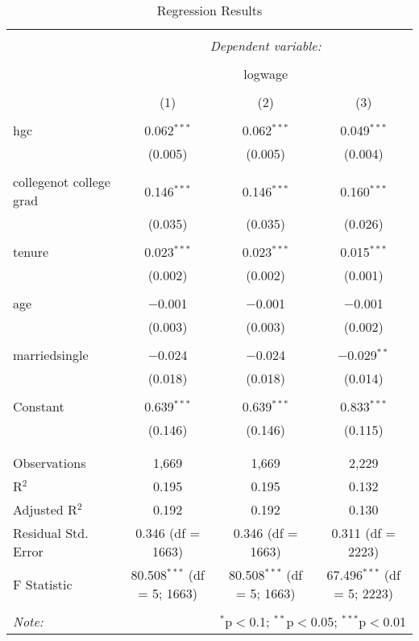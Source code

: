 \documentclass{article}
\begin{document}
\begin{table}[!htbp] \centering 
  \caption{Regression Results} 
  \label{} 
\begin{tabular}{@{\extracolsep{5pt}}lccc} 
\\[-1.8ex]\hline 
\hline \\[-1.8ex] 
 & \multicolumn{3}{c}{\textit{Dependent variable:}} \\ 
\cline{2-4} 
\\[-1.8ex] & \multicolumn{3}{c}{logwage} \\ 
\\[-1.8ex] & (1) & (2) & (3)\\ 
\hline \\[-1.8ex] 
 hgc & 0.062$^{***}$ & 0.062$^{***}$ & 0.049$^{***}$ \\ 
  & (0.005) & (0.005) & (0.004) \\ 
  & & & \\ 
 collegenot college grad & 0.146$^{***}$ & 0.146$^{***}$ & 0.160$^{***}$ \\ 
  & (0.035) & (0.035) & (0.026) \\ 
  & & & \\ 
 tenure & 0.023$^{***}$ & 0.023$^{***}$ & 0.015$^{***}$ \\ 
  & (0.002) & (0.002) & (0.001) \\ 
  & & & \\ 
 age & $-$0.001 & $-$0.001 & $-$0.001 \\ 
  & (0.003) & (0.003) & (0.002) \\ 
  & & & \\ 
 marriedsingle & $-$0.024 & $-$0.024 & $-$0.029$^{**}$ \\ 
  & (0.018) & (0.018) & (0.014) \\ 
  & & & \\ 
 Constant & 0.639$^{***}$ & 0.639$^{***}$ & 0.833$^{***}$ \\ 
  & (0.146) & (0.146) & (0.115) \\ 
  & & & \\ 
\hline \\[-1.8ex] 
Observations & 1,669 & 1,669 & 2,229 \\ 
R$^{2}$ & 0.195 & 0.195 & 0.132 \\ 
Adjusted R$^{2}$ & 0.192 & 0.192 & 0.130 \\ 
Residual Std. Error & 0.346 (df = 1663) & 0.346 (df = 1663) & 0.311 (df = 2223) \\ 
F Statistic & 80.508$^{***}$ (df = 5; 1663) & 80.508$^{***}$ (df = 5; 1663) & 67.496$^{***}$ (df = 5; 2223) \\ 
\hline 
\hline \\[-1.8ex] 
\textit{Note:}  & \multicolumn{3}{r}{$^{*}$p$<$0.1; $^{**}$p$<$0.05; $^{***}$p$<$0.01} \\ 
\end{tabular} 
\end{table} 
\end{document}
